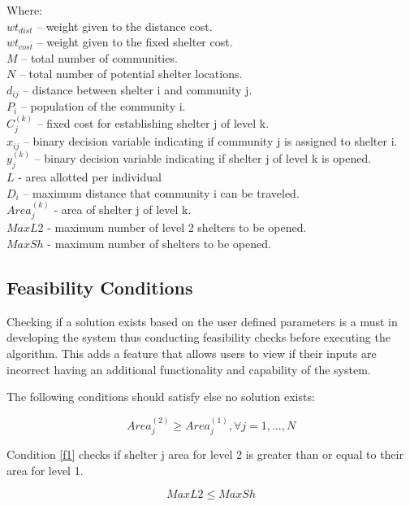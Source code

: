 	\noindent Where:
	\\$wt_{dist}$ – weight given to the distance cost.
	\\$wt_{cost}$ – weight given to the fixed shelter cost.
	\\$M$ – total number of communities.
	\\$N$ – total number of potential shelter locations.
	\\$d_{ij}$ – distance between shelter i and community j.
	\\$P_{i}$ – population of the community i.
	\\$C_{j}^{(k)}$ – fixed cost for establishing shelter j of level k.
	\\$x_{ij}$ – binary decision variable indicating if community j is assigned to shelter i.
	\\$y_{j}^{(k)}$ – binary decision variable indicating if shelter j of level k is opened.
	\\$L$ - area allotted per individual
	\\$D_{i}$ – maximum distance that community i can be traveled.
	\\$Area_{j}^{(k)}$ - area of shelter j of level k.
	\\$MaxL2$ - maximum number of level 2 shelters to be opened.
	\\$MaxSh$ - maximum number of shelters to be opened.
	\\
	
	
\subsection{Feasibility Conditions}

	Checking if a solution exists based on the user defined parameters is a must in developing the system thus conducting feasibility checks before executing the algorithm. This adds a feature that allows users to view if their inputs are incorrect having an additional functionality and capability of the system.
	
	The following conditions should satisfy else no solution exists:
	
	\begin{equation} 
		\label{f1}
		Area_{j}^{(2)} \ge Area_{j}^{(1)}, \forall j = 1, ..., N
	\end{equation}
	
	Condition \ref{f1} checks if shelter j area for level 2 is greater than or equal to their area for level 1. 
	
	\begin{equation} 
		\label{f2}
		MaxL2 \le MaxSh
	\end{equation}
	
